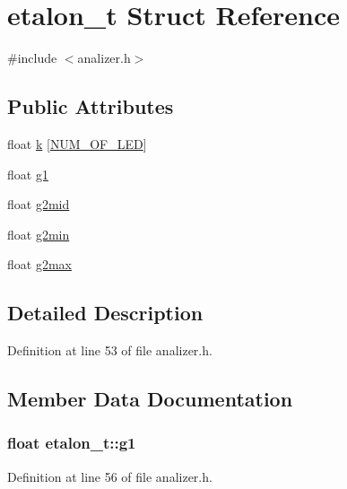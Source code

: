 \hypertarget{structetalon__t}{\section{etalon\+\_\+t Struct Reference}
\label{structetalon__t}
}


{\ttfamily \#include $<$analizer.\+h$>$}

\subsection*{Public Attributes}
\begin{DoxyCompactItemize}
\item 
float \hyperlink{structetalon__t_a70cad7a56e0aaeb8998957d09cf99599}{k} \mbox{[}\hyperlink{analizer_8h_a2bdaf37b88fc3b0920fffa2b6166be22}{N\+U\+M\+\_\+\+O\+F\+\_\+\+L\+E\+D}\mbox{]}
\item 
float \hyperlink{structetalon__t_ab4214655b89793479404ebecceba1532}{g1}
\item 
float \hyperlink{structetalon__t_ab1abc2cac2f88d6e47df1ded10ce0837}{g2mid}
\item 
float \hyperlink{structetalon__t_a1b997b8d360ed62c4b49d5d30e53f64b}{g2min}
\item 
float \hyperlink{structetalon__t_aa305307c0910629f044451f2ffcf8f5e}{g2max}
\end{DoxyCompactItemize}


\subsection{Detailed Description}


Definition at line 53 of file analizer.\+h.



\subsection{Member Data Documentation}
\hypertarget{structetalon__t_ab4214655b89793479404ebecceba1532}{
\subsubsection[{g1}]{\setlength{\rightskip}{0pt plus 5cm}float etalon\+\_\+t\+::g1}}\label{structetalon__t_ab4214655b89793479404ebecceba1532}


Definition at line 56 of file analizer.\+h.

